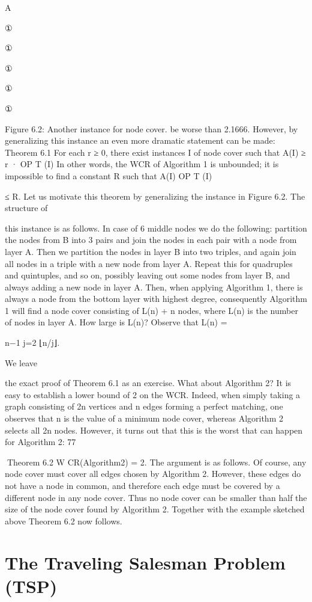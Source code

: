 A

①

①

①

①

①

Figure 6.2: Another instance for node cover.
be worse than 2.1666. However, by generalizing this instance an even more dramatic statement can be
made:
Theorem 6.1 For each r ≥ 0, there exist instances I of node cover such that A(I) ≥ r · OP T (I)
In other words, the WCR of Algorithm 1 is unbounded; it is impossible to find a constant R such that
A(I)
OP T (I)

≤ R. Let us motivate this theorem by generalizing the instance in Figure 6.2. The structure of

this instance is as follows. In case of 6 middle nodes we do the following: partition the nodes from B into
3 pairs and join the nodes in each pair with a node from layer A. Then we partition the nodes in layer
B into two triples, and again join all nodes in a triple with a new node from layer A. Repeat this for
quadruples and quintuples, and so on, possibly leaving out some nodes from layer B, and always adding
a new node in layer A. Then, when applying Algorithm 1, there is always a node from the bottom layer
with highest degree, consequently Algorithm 1 will find a node cover consisting of L(n) + n nodes, where
L(n) is the number of nodes in layer A. How large is L(n)? Observe that L(n) =

n−1
j=2 ⌊n/j⌋.

We leave

the exact proof of Theorem 6.1 as an exercise.
What about Algorithm 2? It is easy to establish a lower bound of 2 on the WCR. Indeed, when simply
taking a graph consisting of 2n vertices and n edges forming a perfect matching, one observes that n is
the value of a minimum node cover, whereas Algorithm 2 selects all 2n nodes. However, it turns out that
this is the worst that can happen for Algorithm 2:
77

Theorem 6.2 W CR(Algorithm2) = 2.
The argument is as follows. Of course, any node cover must cover all edges chosen by Algorithm 2.
However, these edges do not have a node in common, and therefore each edge must be covered by a
different node in any node cover. Thus no node cover can be smaller than half the size of the node cover
found by Algorithm 2. Together with the example sketched above Theorem 6.2 now follows.

\section{The Traveling Salesman Problem (TSP)}

